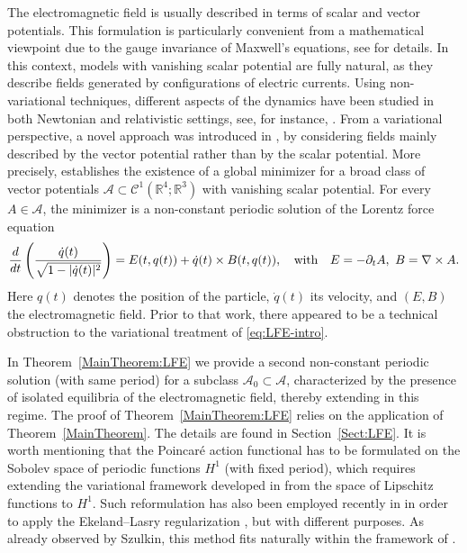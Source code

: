 \documentclass{article}
\newcommand{\R}{\mathbb{R}}
\newcommand{\boA}{\mathcal{A}}
\newcommand{\dq}{\dot{q}}
\theoremstyle{definition}
\begin{document}
The electromagnetic field is usually described in terms of scalar and vector potentials. This formulation is particularly convenient from a mathematical viewpoint due to the gauge invariance of Maxwell's equations, see \cite[Section 3]{GM} for details. In this context, models with vanishing scalar potential are fully natural, as they describe fields generated by configurations of electric currents. Using non-variational techniques, different aspects of the dynamics have been studied in both Newtonian and relativistic settings, see, for instance, \cite{ALP,GT2,GP1,GP2}. From a variational perspective, a novel approach was introduced in \cite{GLM}, by considering fields mainly described by the vector potential rather than by the scalar potential. More precisely, \cite[Theorem 2.1]{GLM} establishes the existence of a global minimizer for a broad class of vector potentials $\boA\subset\mathcal{C}^1(\R^4;\R^3)$ with vanishing scalar potential. For every $A\in\boA$, the minimizer is a non-constant periodic solution of the Lorentz force equation
\begin{equation}\label{eq:LFE-intro}
\dfrac{d}{dt}\left(\frac{\dq(t)}{\sqrt{1-|\dq(t)|^2}}\right)=E(t,q(t)) + \dq(t)\times B(t,q(t)),\quad\hbox{with}\quad E=-\partial_t A,\ B=\nabla\times A.
\end{equation}
Here $q(t)$ denotes the position of the particle, $\dq(t)$ its velocity, and $(E,B)$ the electromagnetic field. Prior to that work, there appeared to be a technical obstruction to the variational treatment of \eqref{eq:LFE-intro}.

In Theorem~\ref{MainTheorem:LFE} we provide a second non-constant periodic solution (with same period) for a subclass $\boA_0\subset\boA$, characterized by the presence of isolated equilibria of the electromagnetic field, thereby extending \cite[Theorem 2.1]{GLM} in this regime. The proof of Theorem~\ref{MainTheorem:LFE} relies on the application of Theorem~\ref{MainTheorem}. The details are found in Section~\ref{Sect:LFE}. It is worth mentioning that the Poincaré action functional has to be formulated on the Sobolev space of periodic functions $H^1$ (with fixed period), which requires extending the variational framework developed in \cite{ABT,GLM} from the space of Lipschitz functions to $H^1$. Such reformulation has also been employed recently in \cite{Ber-Pir} in order to apply the Ekeland--Lasry regularization \cite{Eke-Las}, but with different purposes. As already observed by Szulkin, this method fits naturally within the framework of \cite{Szu}.
\end{document}
